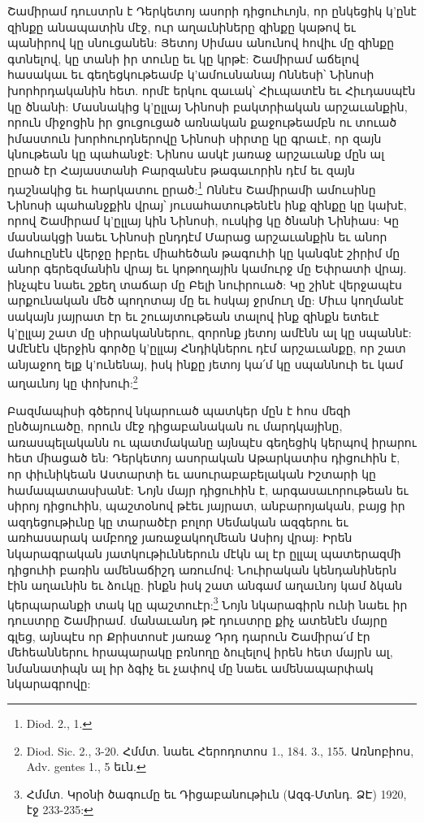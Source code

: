 \documentclass{article}
\begin{document}
{Շամիրամ դուստրն է Դերկետոյ ասորի դիցուհւոյն, որ ընկեցիկ կ'ընէ զինքը անապատին մէջ, ուր աղաւնիները զինքը կաթով եւ պանիրով կը սնուցանեն: Յետոյ Սիմաս անունով հովիւ մը զինքը գտնելով, կը տանի իր տունը եւ կը կրթէ: Շամիրամ աճելով հասակաւ եւ գեղեցկութեամբ կ'ամուսնանայ Ոննեսի՝ Նինոսի խորհրդականին հետ. որմէ երկու զաւակ՝ Հիւպատէն եւ Հիւդասպէն կը ծնանի: Մասնակից կ'ըլլայ Նինոսի բակտրիական արշաւանքին, որուն միջոցին իր ցուցուցած առնական քաջութեամբն ու տուած իմաստուն խորհուրդներովը Նինոսի սիրտը կը գրաւէ, որ զայն կնութեան կը պահանջէ: Նինոս ասկէ յառաջ արշաւանք մըն ալ ըրած էր Հայաստանի Բարզանէս թագաւորին դէմ եւ զայն դաշնակից եւ հարկատու ըրած:\footnote{Diod. 2., 1.} Ոննէս Շամիրամի ամուսինը Նինոսի պահանջքին վրայ՝ յուսահատութենէն ինք զինքը կը կախէ, որով Շամիրամ կ'ըլլայ կին Նինոսի, ուսկից կը ծնանի Նինիաս: Կը մասնակցի նաեւ Նինոսի ընդդէմ Մարաց արշաւանքին եւ անոր մահուընէն վերջը իբրեւ միահեծան թագուհի կը կանգնէ շիրիմ մը անոր գերեզմանին վրայ եւ կոթողային կամուրջ մը Եփրատի վրայ. ինչպէս նաեւ շքեղ տաճար մը Բելի նուիրուած: Կը շինէ վերջապէս արքունական մեծ պողոտայ մը եւ հսկայ ջրմուղ մը: Միւս կողմանէ սակայն յայրատ էր եւ շուայտութեան տալով ինք զինքն ետեւէ կ'ըլլայ շատ մը սիրականներու, զորոնք յետոյ ամէնն ալ կը սպաննէ: Ամէնէն վերջին գործը կ'ըլլայ Հնդիկներու դէմ արշաւանքը, որ շատ անյաջող ելք կ'ունենայ, իսկ ինքը յետոյ կա՛մ կը սպաննուի եւ կամ աղաւնոյ կը փոխուի:\footnote{Diod. Sic. 2., 3-20. Հմմտ. նաեւ Հերոդոտոս 1., 184. 3., 155. Առնոբիոս, Adv. gentes 1., 5 եւն.}

Բազմապիսի գծերով նկարուած պատկեր մըն է հոս մեզի ընծայուածը, որուն մէջ դիցաբանական ու մարդկայինը, առասպելականն ու պատմականը այնպէս գեղեցիկ կերպով իրարու հետ միացած են: Դերկետոյ ասորական Աթարկատիս դիցուհին է, որ փիւնիկեան Աստարտի եւ ասուրաբաբելական Իշտարի կը համապատասխանէ: Նոյն մայր դիցուհին է, արգասաւորութեան եւ սիրոյ դիցուհին, պաշտօնով թէեւ յայրատ, անբարոյական, բայց իր ազդեցութիւնը կը տարածէր բոլոր Սեմական ազգերու եւ առհասարակ ամբողջ յառաջակողմեան Ասիոյ վրայ: Իրեն նկարագրական յատկութիւններուն մէկն ալ էր ըլլալ պատերազմի դիցուհի բառին ամենաճիշդ առումով: Նուիրական կենդանիներն էին աղաւնին եւ ձուկը. ինքն իսկ շատ անգամ աղաւնոյ կամ ձկան կերպարանքի տակ կը պաշտուէր:\footnote{Հմմտ. Կրօնի ծագումը եւ Դիցաբանութիւն (Ազգ-Մտնդ. ՁԷ) 1920, էջ 233-235:} Նոյն նկարագիրն ունի նաեւ իր դուստրը Շամիրամ. մանաւանդ թէ դուստրը քիչ ատենէն մայրը գլեց, այնպէս որ Քրիստոսէ յառաջ Դրդ դարուն Շամիրա՛մ էր մեհեաններու հրապարակը բռնողը ձուլելով իրեն հետ մայրն ալ, նմանատիպն ալ իր ձգիչ եւ չափով մը նաեւ ամենապարփակ նկարագրովը:

}
\end{document}
